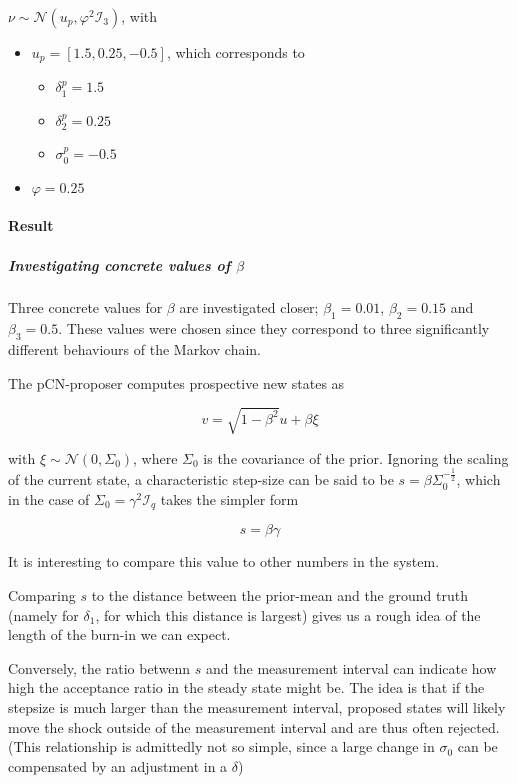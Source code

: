 \documentclass[11pt]{article}
\newcommand{\I}{{\mathcal{I}}}
\newcommand{\N}[2]{\mathcal{N}\left(#1,#2\right)}
\begin{document}
\(\nu \sim \N{u_p}{\varphi^2 \I_3}\), with
\begin{itemize}
\item \(u_p = [1.5, 0.25, -0.5]\),
which corresponds to
\begin{itemize}
\item \(\delta_1^p = 1.5\)
\item \(\delta_2^p = 0.25\)
\item \(\sigma_0^p = -0.5\)
\end{itemize}
\item \(\varphi = 0.25\)
\end{itemize}

\paragraph{Result}
\label{sec:orgf2c13b2}

\subparagraph{Investigating concrete values of \(\beta\)}
\label{sec:org09438f6}

Three concrete values for \(\beta\) are investigated closer; \(\beta_1 = 0.01\), \(\beta_2 = 0.15\)
and \(\beta_3 = 0.5\). These values were chosen since they correspond to three significantly
different behaviours of the Markov chain.

The pCN-proposer computes prospective new states as

$$v = \sqrt{1-\beta^2} u + \beta \xi$$

with \(\xi \sim \N{0}{\Sigma_0}\), where \(\Sigma_0\) is the covariance of the prior. Ignoring the
scaling of the current state, a characteristic step-size can be said to be \(s = \beta \Sigma_0^{-\frac{1}{2}}\),
which in the case of \(\Sigma_0 = \gamma^2 \I_q\) takes the simpler form

\begin{equation}
\label{eqn:char_step}
  s = \beta \gamma
\end{equation}

It is interesting to compare this value to other numbers in the system.

Comparing \(s\) to the distance between the prior-mean and the ground truth (namely for \(\delta_{\text{1}}\),
for which this distance is largest) gives us a rough idea of the length of the burn-in we
can expect.

Conversely, the ratio betwenn \(s\) and the measurement interval can indicate how high the acceptance
ratio in the steady state might be.
The idea is that if the stepsize is much larger than the measurement interval, proposed states will
likely move the shock outside of the measurement interval and are thus often rejected. (This
relationship is admittedly not so simple, since a large change in \(\sigma_{\text{0}}\) can be compensated
by an adjustment in a \(\delta\))
\end{document}
